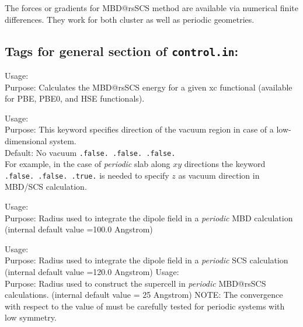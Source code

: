 The forces or gradients for MBD@rsSCS method are available via numerical finite differences. They work for both cluster as well as periodic geometries.

\subsection*{Tags for general section of \texttt{control.in}:}

{
  \noindent
  Usage:  \\[1.0ex]
  Purpose: Calculates the MBD@rsSCS energy for a given xc functional (available for PBE, PBE0, and HSE functionals).
\\[1.0ex]
}

{
  \noindent
  Usage:   \\[1.0ex]
  Purpose: This keyword specifies direction of the vacuum region in case of a low-dimensional system.\\
  Default: No vacuum  \texttt{.false.  .false.  .false.} \\
  For example, in the case of {\it periodic} slab along $xy$ directions the keyword\\
   \texttt{.false.  .false.  .true.} is needed to specify  
  $z$ as vacuum direction in MBD/SCS calculation.
}

{
  \noindent
  Usage:   \\[1.0ex]
  Purpose: Radius used to integrate the dipole field in a {\it periodic} MBD calculation (internal default value =100.0 Angstrom)
}

{
  \noindent
  Usage:   \\[1.0ex]
  Purpose: Radius used to integrate the dipole field in a {\it periodic} SCS calculation (internal default value =120.0 Angstrom) 
}
{
  \noindent
  Usage:   \\[1.0ex]
  Purpose: Radius used to construct the supercell in {\it periodic} MBD@rsSCS calculations. (internal default value = 25 Angstrom)
  NOTE: The convergence with respect to the value of  must be carefully tested for periodic systems with low symmetry.
}


